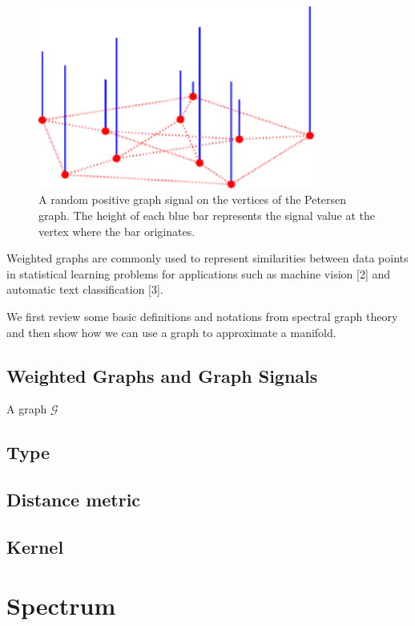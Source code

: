 \documentclass[a4paper,12pt,twoside]{report}
\newcommand{\G}{\mathcal{G}}
\begin{document}
\begin{figure}[ht]
	\centering
	\includegraphics[height=6cm]{img/example_graph}
	\caption[]{A random positive graph signal on the vertices of the Petersen graph. The height of each blue bar represents the signal value at the vertex where the bar originates.\footnotemark}
	\label{example_graph}
\end{figure}

Weighted graphs are commonly used to represent similarities between data points in statistical learning problems for applications such as machine vision
[2] and automatic text classification [3].

We first review some basic definitions and notations from spectral graph theory and then show how we can use a graph to approximate a manifold.

\subsection{Weighted Graphs and Graph Signals}


A graph $\G$

\subsection{Type}

\subsection{Distance metric}

\subsection{Kernel}

\section{Spectrum}
\end{document}
